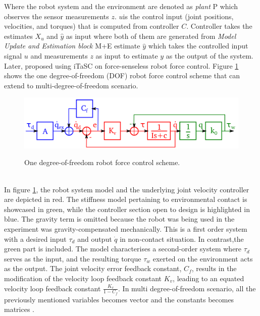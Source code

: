 \documentclass[report.tex]{subfiles}
\begin{document}
    Where the robot system and the environment are denoted as \textit{plant} P which observes the sensor measurements $z$. $u$is the control input (joint positions, velocities, and torques) that is computed from controller $C$. Controller takes the estimates $X_u$ and $\widehat{y}$ as input where both of them are generated from \textit{Model Update and Estimation block} M+E  estimate $\widehat{y}$ which takes the controlled input signal $u$ and measurements $z$ as input to estimate $y$ as the output of the system.\\
    Later, \cite{vanthienen2013force} proposed using iTaSC on force-senseless robot force control. Figure \ref{fig:itasc_nosensor} shows the one degree-of-freedom (DOF) robot force control scheme that can extend to multi-degree-of-freedom scenario.\\ \begin{figure}[h!]
        \centering
        \includegraphics[width=0.8\linewidth]{images/iTaSC_nosensor.png}
        \caption{One degree-of-freedom robot force control scheme.}\cite{vanthienen2013force}
        \label{fig:itasc_nosensor}
    \end{figure}\\
    In figure \ref{fig:itasc_nosensor}, the robot system model and the underlying joint velocity controller are depicted in red. The stiffness model pertaining to environmental contact is showcased in green, while the controller section open to design is highlighted in blue. The gravity term is omitted because the robot was being used in the experiment was gravity-compensated mechanically. This is a first order system with a desired input $\tau_d$ and output $\dot{q}$ in non-contact situation. In contrast,the green part is included. The model characterises a second-order system where $\tau_d$ serves as the input, and the resulting torque $\tau_w$ exerted on the environment acts as the output. The joint velocity error feedback constant, $C_f$, results in the modification of the velocity loop feedback constant $K_v$, leading to an equated velocity loop feedback constant $\frac{K_v}{1-C_f}$. In multi degree-of-freedom scenario, all the previously mentioned variables becomes vector and the constants becomes matrices \cite{vanthienen2013force}.
\end{document}
